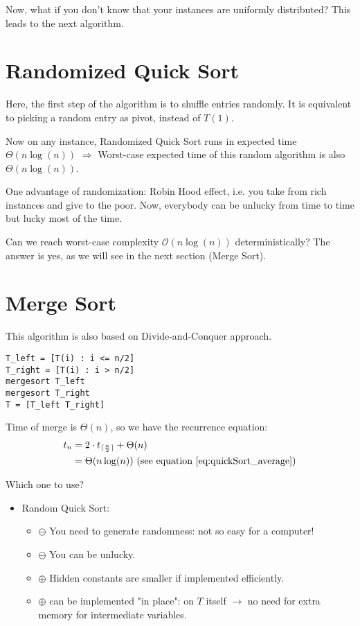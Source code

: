Now, what if you don't know that your instances are uniformly distributed? This leads to the next algorithm.

\section{Randomized Quick Sort}
Here, the first step of the algorithm is to shuffle entries randomly. It is equivalent to picking a random entry as pivot, instead of $T(1)$.

Now on any instance, Randomized Quick Sort runs in expected time $\Theta(n \log(n))$ $\Rightarrow$ Worst-case expected time of this random algorithm is also $\Theta(n \log(n))$. 

One advantage of randomization: Robin Hood effect, i.e. you take from rich instances and give to the poor. Now, everybody can be unlucky from time to time but lucky most of the time. 

Can we reach worst-case complexity $\mathcal{O}(n \log(n))$ deterministically? 
\newline The answer is yes, as we will see in the next section (Merge Sort). 

\section{Merge Sort}

This algorithm is also based on Divide-and-Conquer approach. 

\begin{lstlisting}[label={list:c1:merge},caption=Pseudo-code of the merge sort algorithm]
T_left = [T(i) : i <= n/2]
T_right = [T(i) : i > n/2]
mergesort T_left
mergesort T_right
T = [T_left T_right]
\end{lstlisting}

Time of merge is $\Theta(n)$, so we have the recurrence equation: 
\begin{align*}
t_n & = 2 \cdot t_{\lceil \frac{n}{2}\rceil}+ \Theta(n) \\
& = \Theta(n \log(n))  \text{ (see equation~\eqref{eq:quickSort_average})}
\end{align*}

Which one to use?
\begin{itemize}
\renewcommand{\labelitemi}{$\bullet$}
	\item Random Quick Sort:
	 \begin{itemize}
		\item $\ominus$ You need to generate randomness: not so easy for a computer!
		\item $\ominus$ You can be unlucky.	
		\item $\oplus$ Hidden constants are smaller if implemented efficiently. 
		\item $\oplus$ can be implemented "in place": on $T$ itself $\rightarrow$ no need for extra memory for intermediate variables.
	\end{itemize} 
	
\end{itemize}